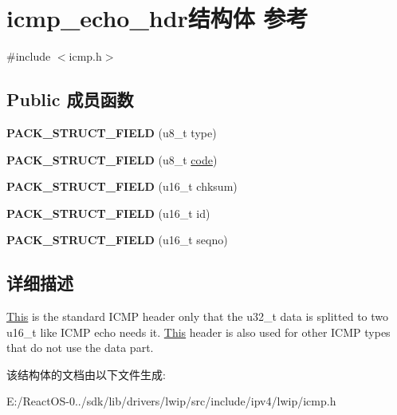 \hypertarget{structicmp__echo__hdr}{}\section{icmp\+\_\+echo\+\_\+hdr结构体 参考}
\label{structicmp__echo__hdr}


{\ttfamily \#include $<$icmp.\+h$>$}

\subsection*{Public 成员函数}
\begin{DoxyCompactItemize}
\item 
\mbox{\label{structicmp__echo__hdr_a628281d8598df1d2ebc16ed59c72d1c0}} 
{\bfseries P\+A\+C\+K\+\_\+\+S\+T\+R\+U\+C\+T\+\_\+\+F\+I\+E\+LD} (u8\+\_\+t type)
\item 
\mbox{\label{structicmp__echo__hdr_a05adf7444332cf0f1497b5e009b2bc3e}} 
{\bfseries P\+A\+C\+K\+\_\+\+S\+T\+R\+U\+C\+T\+\_\+\+F\+I\+E\+LD} (u8\+\_\+t \hyperlink{structcode}{code})
\item 
\mbox{\label{structicmp__echo__hdr_a5d1bdfcc4a8bdd58513ecbaea368c1ad}} 
{\bfseries P\+A\+C\+K\+\_\+\+S\+T\+R\+U\+C\+T\+\_\+\+F\+I\+E\+LD} (u16\+\_\+t chksum)
\item 
\mbox{\label{structicmp__echo__hdr_a35dd6758d625e1542599175e65235362}} 
{\bfseries P\+A\+C\+K\+\_\+\+S\+T\+R\+U\+C\+T\+\_\+\+F\+I\+E\+LD} (u16\+\_\+t id)
\item 
\mbox{\label{structicmp__echo__hdr_a2d2722057bc87fa0afb495ba6716eb57}} 
{\bfseries P\+A\+C\+K\+\_\+\+S\+T\+R\+U\+C\+T\+\_\+\+F\+I\+E\+LD} (u16\+\_\+t seqno)
\end{DoxyCompactItemize}


\subsection{详细描述}
\hyperlink{namespace_this}{This} is the standard I\+C\+MP header only that the u32\+\_\+t data is splitted to two u16\+\_\+t like I\+C\+MP echo needs it. \hyperlink{namespace_this}{This} header is also used for other I\+C\+MP types that do not use the data part. 

该结构体的文档由以下文件生成\+:\begin{DoxyCompactItemize}
\item 
E\+:/\+React\+O\+S-\/0../sdk/lib/drivers/lwip/src/include/ipv4/lwip/icmp.\+h\end{DoxyCompactItemize}
